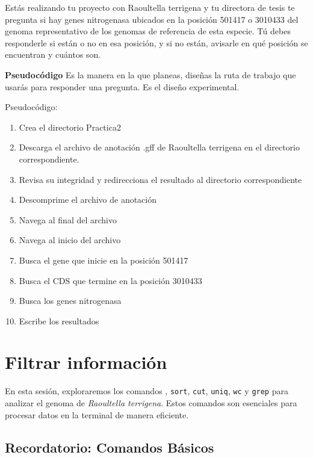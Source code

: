 \documentclass[
]{book}
\begin{document}
Estás realizando tu proyecto con Raoultella terrigena y tu directora de tesis te pregunta si hay genes nitrogenasa ubicados en la posición 501417 o 3010433 del genoma representativo de los genomas de referencia de esta especie. Tú debes responderle si están o no en esa posición, y si no están, avisarle en qué posición se encuentran y cuántos son.

\textbf{Pseudocódigo} Es la manera en la que planeas, diseñas la ruta de trabajo que usarás para responder una pregunta. Es el diseño experimental.

Pseudocódigo:

\begin{enumerate}
\def\labelenumi{\arabic{enumi}.}
\item
  Crea el directorio Practica2
\item
  Descarga el archivo de anotación .gff de Raoultella terrigena en el directorio correspondiente.
\item
  Revisa su integridad y redirecciona el resultado al directorio correspondiente
\item
  Descomprime el archivo de anotación
\item
  Navega al final del archivo
\item
  Navega al inicio del archivo
\item
  Busca el gene que inicie en la posición 501417
\item
  Busca el CDS que termine en la posición 3010433
\item
  Busca los genes nitrogenasa
\item
  Escribe los resultados
\end{enumerate}

\chapter{Filtrar información}\label{filtrar-informaciuxf3n}

En esta sesión, exploraremos los comandos \texttt{\textbar{}}, \texttt{sort}, \texttt{cut}, \texttt{uniq}, \texttt{wc} y \texttt{grep} para analizar el genoma de \emph{Raoultella terrigena}. Estos comandos son esenciales para procesar datos en la terminal de manera eficiente.

\section{Recordatorio: Comandos Básicos}\label{recordatorio-comandos-buxe1sicos}
\end{document}

